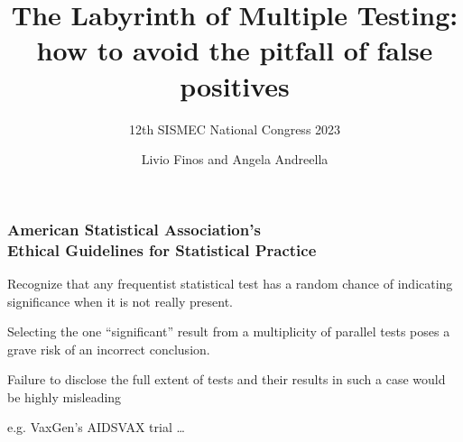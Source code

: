 \documentclass[xcolor={pdftex,dvipsnames,table}]{beamer}
\title[]{The Labyrinth of Multiple Testing: how to avoid the pitfall of false positives}
\subtitle{12th SISMEC National Congress 2023}
\author[\hspace{5cm}]{Livio Finos and Angela Andreella}
\date{}
\begin{document}
\begin{frame}
  \titlepage
\end{frame}

\begin{frame}
\frametitle{American Statistical Association's\\
Ethical Guidelines for Statistical Practice}

Recognize that any frequentist %
statistical test has a random %
chance of indicating significance %
when it is not really present. %
\bigskip

Selecting the one ``significant'' %
result from a multiplicity of parallel  %
tests poses a grave risk of an  %
incorrect conclusion.   %
\bigskip

Failure to disclose the full extent %
of tests and their results in such  %
a case would be highly misleading %
\pause

\bigskip
e.g. VaxGen's AIDSVAX trial \ldots
\end{frame}

\end{document}
